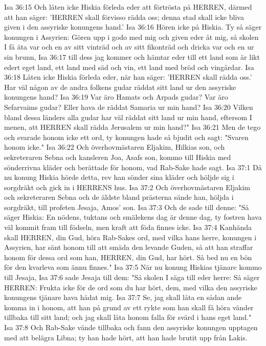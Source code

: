 Isa 36:15  Och låten icke Hiskia förleda eder att förtrösta på HERREN, därmed att han säger: 'HERREN skall förvisso rädda oss; denna stad skall icke bliva given i den assyriske konungens hand.'
Isa 36:16  Hören icke på Hiskia. Ty så säger konungen i Assyrien: Gören upp i godo med mig och given eder åt mig, så skolen I få äta var och en av sitt vinträd och av sitt fikonträd och dricka var och en ur sin brunn,
Isa 36:17  till dess jag kommer och hämtar eder till ett land som är likt edert eget land, ett land med säd och vin, ett land med bröd och vingårdar.
Isa 36:18  Låten icke Hiskia förleda eder, när han säger: 'HERREN skall rädda oss.' Har väl någon av de andra folkens gudar räddat sitt land ur den assyriske konungens hand?
Isa 36:19  Var äro Hamats och Arpads gudar? Var äro Sefarvaims gudar? Eller hava de räddat Samaria ur min hand?
Isa 36:20  Vilken bland dessa länders alla gudar har väl räddat sitt land ur min hand, eftersom I menen, att HERREN skall rädda Jerusalem ur min hand?"
Isa 36:21  Men de tego och svarade honom icke ett ord, ty konungen hade så bjudit och sagt: "Svaren honom icke."
Isa 36:22  Och överhovmästaren Eljakim, Hilkias son, och sekreteraren Sebna och kansleren Joa, Asafs son, kommo till Hiskia med sönderrivna kläder och berättade för honom, vad Rab-Sake hade sagt.
Isa 37:1  Då nu konung Hiskia hörde detta, rev han sönder sina kläder och höljde sig i sorgdräkt och gick in i HERRENS hus.
Isa 37:2  Och överhovmästaren Eljakim och sekreteraren Sebna och de äldste bland prästerna sände han, höljda i sorgdräkt, till profeten Jesaja, Amos' son.
Isa 37:3  Och de sade till denne: "Så säger Hiskia: En nödens, tuktans och smälekens dag är denne dag, ty fostren hava väl kommit fram till födseln, men kraft att föda finnes icke.
Isa 37:4  Kanhända skall HERREN, din Gud, höra Rab-Sakes ord, med vilka hans herre, konungen i Assyrien, har sänt honom till att smäda den levande Guden, så att han straffar honom för dessa ord som han, HERREN, din Gud, har hört. Så bed nu en bön för den kvarleva som ännu finnes."
Isa 37:5  När nu konung Hiskias tjänare kommo till Jesaja,
Isa 37:6  sade Jesaja till dem: "Så skolen I säga till eder herre: Så säger HERREN: Frukta icke för de ord som du har hört, dem, med vilka den assyriske konungens tjänare hava hädat mig.
Isa 37:7  Se, jag skall låta en sådan ande komma in i honom, att han på grund av ett rykte som han skall få höra vänder tillbaka till sitt land; och jag skall låta honom falla för svärd i hans eget land."
Isa 37:8  Och Rab-Sake vände tillbaka och fann den assyriske konungen upptagen med att belägra Libna; ty han hade hört, att han hade brutit upp från Lakis.
